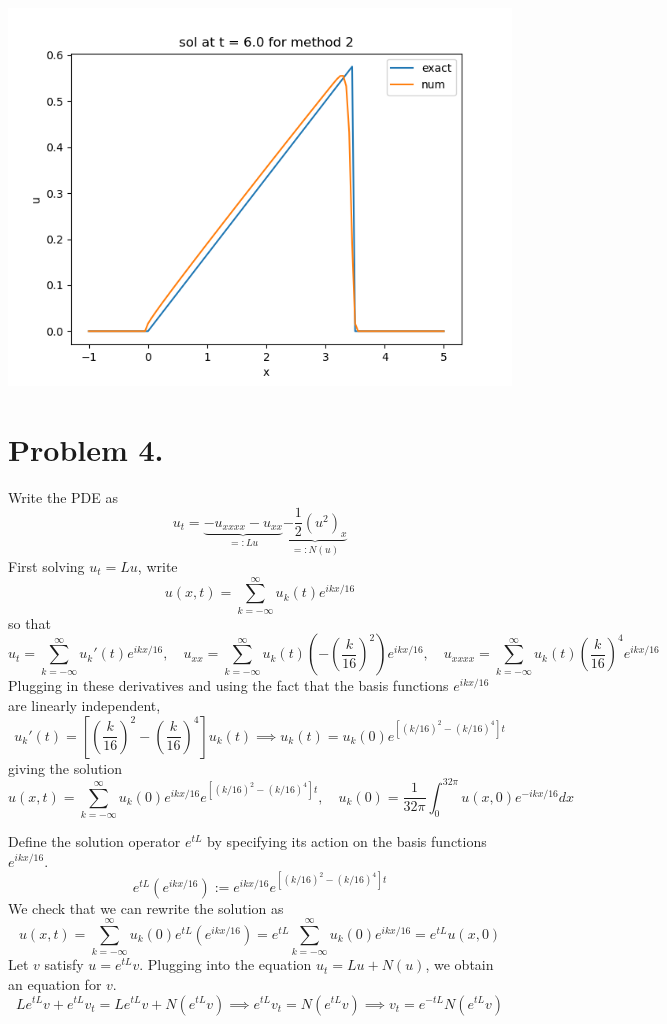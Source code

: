 \documentclass{article}
\newcommand{\br}[1]{\left(#1\right)}
\newcommand{\sbr}[1]{\left[#1\right]}
\newcommand{\imp}{\implies}
\begin{document}
\begin{center}
	\includegraphics[scale=.3]{hw13 sol t = 6 method 2}
\end{center}

\section*{Problem 4.}
Write the PDE as
$$u_t = \underbrace{-u_{xxxx} - u_{xx}}_{=:Lu} \underbrace{-\frac12(u^2)_x}_{=:N(u)}$$
First solving $u_t=Lu$, write
$$u(x,t) = \sum_{k=-\infty}^{\infty} u_k(t)e^{ikx/16}$$
so that
$$u_t = \sum_{k=-\infty}^{\infty} u_k'(t)e^{ikx/16},
\quad u_{xx} = \sum_{k=-\infty}^{\infty} u_k(t)\br{-\br{\frac{k}{16}}^2}e^{ikx/16},
\quad u_{xxxx} = \sum_{k=-\infty}^{\infty} u_k(t)\br{\frac{k}{16}}^4e^{ikx/16}$$
Plugging in these derivatives and using the fact that the basis functions $e^{ikx/16}$ are linearly independent,
$$u_k'(t) = \sbr{\br{\frac{k}{16}}^2 - \br{\frac{k}{16}}^4}u_k(t)
\imp u_k(t) = u_k(0)e^{[(k/16)^2 - (k/16)^4]t}$$
giving the solution
$$u(x,t) = \sum_{k=-\infty}^{\infty} u_k(0)e^{ikx/16}e^{[(k/16)^2 - (k/16)^4]t},
\quad u_k(0) = \frac{1}{32\pi}\int_0^{32\pi} u(x,0)e^{-ikx/16}dx$$

Define the solution operator $e^{tL}$ by specifying its action on the basis functions $e^{ikx/16}$.
$$e^{tL}(e^{ikx/16}) := e^{ikx/16}e^{[(k/16)^2 - (k/16)^4]t}$$
We check that we can rewrite the solution as
$$u(x,t) = \sum_{k=-\infty}^{\infty} u_k(0)e^{tL}(e^{ikx/16})
= e^{tL}\sum_{k=-\infty}^{\infty} u_k(0)e^{ikx/16}
= e^{tL}u(x,0)$$
Let $v$ satisfy $u=e^{tL}v$. Plugging into the equation $u_t=Lu+N(u)$, we obtain an equation for $v$.
$$Le^{tL}v + e^{tL}v_t = Le^{tL}v + N(e^{tL}v)
\imp e^{tL}v_t = N(e^{tL}v)
\imp v_t = e^{-tL}N(e^{tL}v)$$
\end{document}
